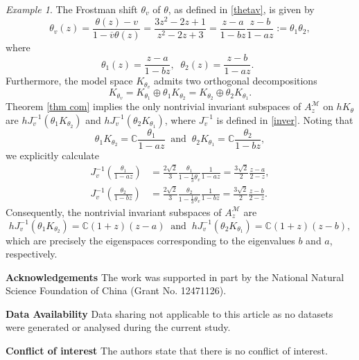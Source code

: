 \documentclass[12pt,reqno]{amsart}
\theoremstyle{definition}
\theoremstyle{remark}
\newtheorem{exm}[thm]{Example}
\numberwithin{equation}{section}
\newcommand{\ol}{\overline}
\newcommand{\ma}{\mathcal}
\begin{document}
\begin{exm}
The Frostman shift $\theta_v$  of $\theta$, as defined in  \eqref{thetav}, is given by $$\theta_v(z)=\frac{\theta(z)-v}{1-\ol{v}\theta(z)}
=\frac{3z^2-2z+1}{z^2-2z+3}=\frac{z-a}{1-bz} \frac{z-b}{1-az}:=\theta_1\theta_2, $$ where   $$ \theta_1(z)=\frac{z-a}{1-bz},\;\;\theta_2(z)=\frac{z-b}{1-az}.
\;\;$$   Furthermore, the model space $K_{\theta_v}$ admits two orthogonal decompositions  $$ K_{\theta_v}=K_{\theta_1}\oplus \theta_1K_{\theta_2}=K_{\theta_2}\oplus \theta_2K_{\theta_1}.$$   Theorem \ref{thm com} implies the only nontrivial invariant subspaces of $A_{z}^{\ma{M}}$ on $hK_\theta$ are $hJ_v^{-1}(\theta_1K_{\theta_2})$ and $hJ_v^{-1}(\theta_2 K_{\theta_1})$, where $J_v^{-1}$ is defined in \eqref{inver}. Noting that $$\theta_1K_{\theta_2}=\mathbb{C}\frac{\theta_1}{1-az}\;\;\mbox{and}\;\;
\theta_2K_{\theta_1}=\mathbb{C}\frac{\theta_2}{1-bz},$$  we explicitly calculate  \begin{align*}  J_v^{-1}\left(\frac{\theta_1}{1-az} \right)&=\frac{2\sqrt{2}}{3} \frac{ \theta_1}{1-\frac{1}{3}\theta_v}\frac{1}{1-az}=
\frac{3\sqrt{2}}{2}\frac{z-a}{2-z},\\  J_v^{-1}\left(\frac{\theta_2}{1-bz} \right)&=\frac{2\sqrt{2}}{3} \frac{ \theta_2}{1-\frac{1}{3}\theta_v}\frac{1}{1-bz}=
\frac{3\sqrt{2}}{2}\frac{z-b}{2-z}.\end{align*} Consequently, the  nontrivial invariant subspaces of $A_z^{\ma{M}}$ are $$hJ_v^{-1}(\theta_1 K_{\theta_2})= \mathbb{C}(1+z)(z-a)\;
\;\mbox{and}\;\; hJ_v^{-1}(\theta_2 K_{\theta_1})= \mathbb{C}(1+z)(z-b),$$ which are precisely the eigenspaces  corresponding to the eigenvalues $b$ and $a$, respectively.\end{exm}

 \textbf{Acknowledgements}\;\; The work was supported in part by the National Natural Science Foundation of China (Grant No. 12471126).
\vspace{1mm}

\textbf{Data Availability}\;\; Data sharing not applicable to this article as no datasets were generated or analysed during
the current study.

\textbf{Conflict of interest}\;\; The authors state that there is no conflict of interest.
\end{document}
